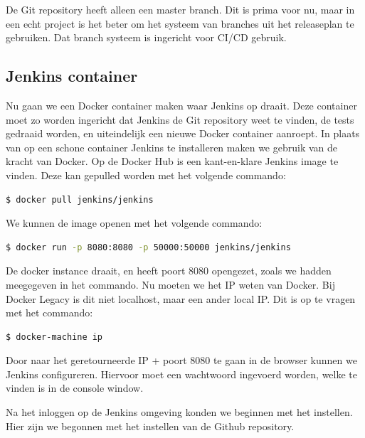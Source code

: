 \documentclass[12pt]{article}
\begin{document}
De Git repository heeft alleen een master branch. Dit is prima voor nu, maar in een echt project is het beter om het systeem van branches uit het releaseplan te gebruiken. Dat branch systeem is ingericht voor CI/CD gebruik.

\subsection{Jenkins container}
Nu gaan we een Docker container maken waar Jenkins op draait. Deze container moet zo worden ingericht dat Jenkins de Git repository weet te vinden, de tests gedraaid worden, en uiteindelijk een nieuwe Docker container aanroept.
\linebreak
In plaats van op een schone container Jenkins te installeren maken we gebruik van de kracht van Docker. Op de Docker Hub is een kant-en-klare Jenkins image te vinden. Deze kan gepulled worden met het volgende commando:

\begin{lstlisting}[language=Bash]
    $ docker pull jenkins/jenkins
\end{lstlisting}

\noindent We kunnen de image openen met het volgende commando:

\begin{lstlisting}[language=Bash]
    $ docker run -p 8080:8080 -p 50000:50000 jenkins/jenkins
\end{lstlisting}

\noindent De docker instance draait, en heeft poort 8080 opengezet, zoals we hadden meegegeven in het commando. Nu moeten we het IP weten van Docker. Bij Docker Legacy is dit niet localhost, maar een ander local IP. Dit is op te vragen met het commando:

\begin{lstlisting}[language=Bash]
    $ docker-machine ip
\end{lstlisting}

\noindent Door naar het geretourneerde IP + poort 8080 te gaan in de browser kunnen we Jenkins configureren. Hiervoor moet een wachtwoord ingevoerd worden, welke te vinden is in de console window.

\noindent Na het inloggen op de Jenkins omgeving konden we beginnen met het instellen. Hier zijn we begonnen met het instellen van de Github repository.
\end{document}
